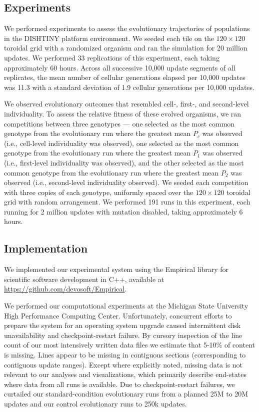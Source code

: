 {\subsection{Experiments}

We performed experiments to assess the evolutionary trajectories of populations in the DISHTINY platform environment.
We seeded each tile on the $120 \times 120$ toroidal grid with a randomized organism and ran the simulation for 20 million updates.
We performed 33 replications of this experiment, each taking approximately 60 hours.
Across all successive 10,000 update segments of all replicates, the mean number of cellular generations elapsed per 10,000 updates was 11.3 with a standard deviation of 1.9 cellular generations per 10,000 updates.

We observed evolutionary outcomes that resembled cell-, first-, and second-level individuality.
To assess the relative fitness of these evolved organisms, we ran competitions between three genotypes --- one selected as the most common genotype from the evolutionary run where the greatest mean $P_{c}$ was observed (i.e., cell-level individuality was observed), one selected as the most common genotype from the evolutionary run where the greatest mean $P_1$ was observed (i.e., first-level individuality was observed), and the other selected as the most common genotype from the evolutionary run where the greatest mean $P_2$ was observed (i.e., second-level individuality observed).
We seeded each competition with three copies of each genotype, uniformly spaced over the $120 \times 120$ toroidal grid with random arrangement.
We performed 191 runs in this experiment, each running for 2 million updates with mutation disabled, taking approximately 6 hours.

\subsection{Implementation}

We implemented our experimental system using the Empirical library for scientific software development in C++, available at \url{https://github.com/devosoft/Empirical}.

We performed our computational experiments at the Michigan State University High Performance Computing Center.
Unfortunately, concurrent efforts to prepare the system for an operating system upgrade caused intermittent disk unavailability and checkpoint-restart failure.
By cursory inspection of the line count of our most intensively written data files we estimate that 5-10\% of content is missing.
Lines appear to be missing in contiguous sections (corresponding to contiguous update ranges).
Except where explicitly noted, missing data is not relevant to our analyses and visualizations, which primarily describe end-states where data from all runs is available.
Due to checkpoint-restart failures, we curtailed our standard-condition evolutionary runs from a planned 25M to 20M updates and our control evolutionary runs to 250k updates.

}
